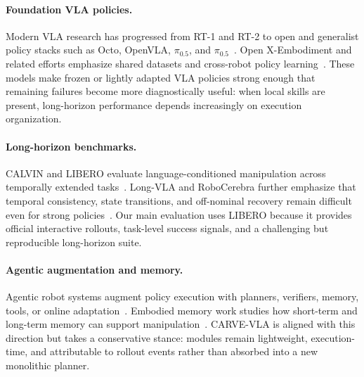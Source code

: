 \documentclass[runningheads]{waica}
\newcommand{\method}{CARVE-VLA}
\newcommand{\pizero}{$\pi_{0.5}$}
\begin{document}
\paragraph{Foundation VLA policies.}
Modern VLA research has progressed from RT-1 and RT-2 to open and generalist policy stacks such as Octo, OpenVLA, \pizero{}, and \pizero{}~\cite{brohan2022rt1,brohan2023rt2,octo2024octo,kim2024openvla,black2024pi0,physicalintelligence2025pi05}.
Open X-Embodiment and related efforts emphasize shared datasets and cross-robot policy learning~\cite{oneill2023openx}.
These models make frozen or lightly adapted VLA policies strong enough that remaining failures become more diagnostically useful: when local skills are present, long-horizon performance depends increasingly on execution organization.

\paragraph{Long-horizon benchmarks.}
CALVIN and LIBERO evaluate language-conditioned manipulation across temporally extended tasks~\cite{mees2021calvin,liu2023libero}.
Long-VLA and RoboCerebra further emphasize that temporal consistency, state transitions, and off-nominal recovery remain difficult even for strong policies~\cite{fan2025longvla,han2025robocerebra}.
Our main evaluation uses LIBERO because it provides official interactive rollouts, task-level success signals, and a challenging but reproducible long-horizon suite.

\paragraph{Agentic augmentation and memory.}
Agentic robot systems augment policy execution with planners, verifiers, memory, tools, or online adaptation~\cite{yang2025agenticrobot,li2026roboclaw,pang2026scivla,jin2026agenticvla}.
Embodied memory work studies how short-term and long-term memory can support manipulation~\cite{torne2026mem,shi2025memoryvla}.
\method{} is aligned with this direction but takes a conservative stance: modules remain lightweight, execution-time, and attributable to rollout events rather than absorbed into a new monolithic planner.
\end{document}
